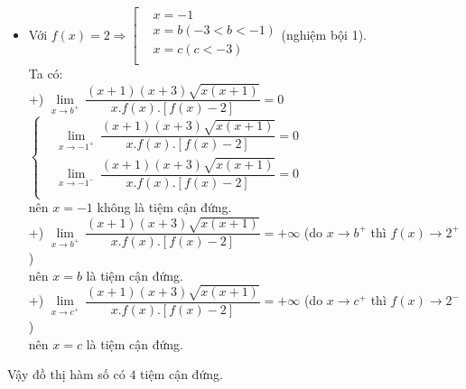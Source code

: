 \begin{ex}
{\begin{itemize}
			Ta có: $\underset{x\to -3^+}{\mathop{\lim }}\,\dfrac{\left(x+1\right)\left(x+3\right)\sqrt{x\left(x+1\right)}}{x.f\left(x\right).\left[f\left(x\right)-2\right]}=-\infty$ nên $x=-3$ là tiệm cận đứng.
			\item Với $f\left(x \right)=2\Rightarrow\left[\begin{aligned}
				& x=-1 \\ 
				& x=b\left( -3<b<-1 \right) \\ 
				& x=c\left( c<-3 \right) \\ 
			\end{aligned}\right.$(nghiệm bội 1).\\
			Ta có:\\
			+) $\underset{x\to b^+}{\mathop{\lim }}\,\dfrac{\left(x+1\right)\left(x+3 \right)\sqrt{x\left(x+1\right)}}{x.f\left(x\right).\left[f\left(x\right)-2\right]}=0$ $\left\{\begin{aligned}
				& \underset{x\to -1^+}{\mathop{\lim }}\,\dfrac{\left(x+1\right)\left(x+3 \right)\sqrt{x\left(x+1 \right)}}{x.f\left(x \right).\left[ f\left(x \right)-2\right]}=0 \\ 
				& \underset{x\to -1^-}{\mathop{\lim }}\,\dfrac{\left(x+1\right)\left(x+3\right)\sqrt{x\left(x+1\right)}}{x.f\left(x\right).\left[f\left(x \right)-2 \right]}=0 \\ 
			\end{aligned} \right.$ \\
			nên $x=-1$ không là tiệm cận đứng.\\
			+) $\underset{x\to b^+}{\mathop{\lim }}\,\dfrac{\left(x+1 \right)\left(x+3 \right)\sqrt{x\left(x+1\right)}}{x.f\left(x \right).\left[f\left(x \right)-2 \right]}=+\infty $ (do $x\to b^+$ thì $f\left(x\right)\to 2^+$) \\
			nên $x=b$ là tiệm cận đứng.\\
			+) $\underset{x\to c^+}{\mathop{\lim }}\,\dfrac{\left(x+1 \right)\left(x+3 \right)\sqrt{x\left(x+1 \right)}}{x.f\left( x \right).\left[f\left(x \right)-2 \right]}=+\infty $ (do $x\to c^+$ thì $f\left(x\right)\to 2^-$) \\
			nên $x=c$ là tiệm cận đứng.
		\end{itemize}
		Vậy đồ thị hàm số có $4$ tiệm cận đứng.}
\end{ex}
